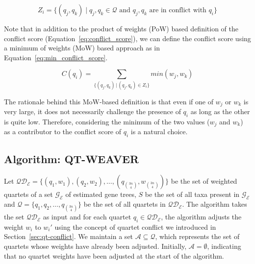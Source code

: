 \documentclass[runningheads]{llncs}
\begin{document}
$$
Z_i = \{(q_j, q_k) \mid q_j, q_k \in \mathcal{Q} \text{ and } q_j, q_k \text{ are in conflict with } q_i\}
$$

%


Note that in addition to the product of weights (PoW) based definition of the conflict score (Equation~\ref{eq:conflict_score}), we can define the conflict score using a minimum of weights (MoW) based approach as in Equation~\ref{eq:min_conflict_score}. %

\begin{equation}
\label{eq:min_conflict_score}
C(q_i) = \sum_{\{(q_j, q_k) \,|\, (q_j, q_k) \in Z_i\}} min(w_j , w_k)
\end{equation}

The rationale behind this MoW-based definition is that even if one of $w_j$ or $w_k$ is very large, it does not necessarily challenge the presence of $q_i$ as long as the other is quite low. Therefore, considering the minimum of the two values ($w_j$ and $w_k$) as a contributor to the conflict score of $q_i$ is a natural choice.


\subsection{Algorithm: QT-WEAVER}
\label{sec:qt-weaver-algorithm}

Let $\mathcal{QD_E} = \{ (q_1,w_1), (q_2,w_2), \ldots, (q_{3n \choose 4},w_{3n \choose 4}) \}$ be the set of weighted quartets of a set $\mathcal{G_E}$ of estimated gene trees, $S$ be the set of all taxa present in  $\mathcal{G_E}$ and $\mathcal{Q} = \{ q_1, q_2, \ldots,q_{3n \choose 4} \} $ be the set of all quartets in $\mathcal{QD_E}$. The algorithm takes the set $\mathcal{QD_E}$ as input and for each quartet $q_i \in \mathcal{QD_E}$, the algorithm adjusts the weight $w_i$ to $w_i'$ using the concept of quartet conflict we introduced in Section~\ref{sec:qt-conflict}. We maintain a set \( \mathcal{A} \subseteq \mathcal{Q} \), which represents the set of quartets whose weights have already been adjusted.  Initially, \( \mathcal{A} = \emptyset \), indicating that no quartet weights have been adjusted at the start of the algorithm.
\end{document}
